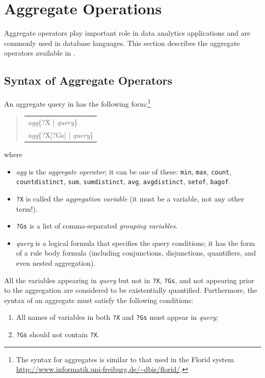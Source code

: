 \documentclass[11pt]{article}
\newcommand{\ERGO}{\mbox{\smaller{\ensuremath{\cal{E}}\smaller{{\sc{RGO}}}}}\xspace}
\newcommand{\FLSYSTEM}{\ERGO}
\newenvironment{qrules}{\begin{quote}\tt\begin{tabular}[t]{l}}%
{\end{tabular}\end{quote}}
\newcommand{\FLORID}{{\mbox{\sc Florid}}\xspace}
\begin{document}




\section{Aggregate Operations}
\label{sec-aggregates}

Aggregate operators play important role in data analytics applications and
are commonly used in database languages. This section describes the
aggregate operators available in \FLSYSTEM.

\subsection{Syntax of Aggregate Operators}

An aggregate query in \FLSYSTEM has the following form:\footnote{
The syntax for aggregates is similar to that used in the \FLORID
system
  \url{http://www.informatik.uni-freiburg.de/~dbis/florid/}.
}
\begin{qrules}
\textnormal{\emph{agg}}\{?X $|$ {\it query}\}\\
\textnormal{\emph{agg}}\{?X[?Gs] $|$ {\it query}\}\\
\end{qrules}
%
where
\begin{itemize}
\item  \emph{agg} is the \emph{aggregate operator};  it can be one of these:
  \texttt{min},
  \texttt{max}, \texttt{count}, \texttt{countdistinct},  \texttt{sum},
  \texttt{sumdistinct},  \texttt{avg}, \texttt{avgdistinct},  \texttt{setof},
  \texttt{bagof}.
\item {\tt ?X} is called the \emph{aggregation variable} (it must be a
  variable, not any other term!).
\item {\tt ?Gs} is a list of comma-separated \emph{grouping variables}.
\item {\it query} is a logical formula that specifies the
  query conditions; it has the form of a rule body formula (including
  conjunctions, disjunctions, quantifiers, and even nested aggregation).
\end{itemize}

All the variables appearing in {\it query} but not in {\tt ?X}, {\tt ?Gs},
and not appearing prior to the aggregation are
considered to be existentially quantified. Furthermore, the syntax of an
aggregate must satisfy the following conditions:
\begin{enumerate}
\item All names of variables in both {\tt ?X} and {\tt ?Gs} must
appear in {\it query};
\item {\tt ?Gs} should not contain {\tt ?X}.
\end{enumerate}
\end{document}

